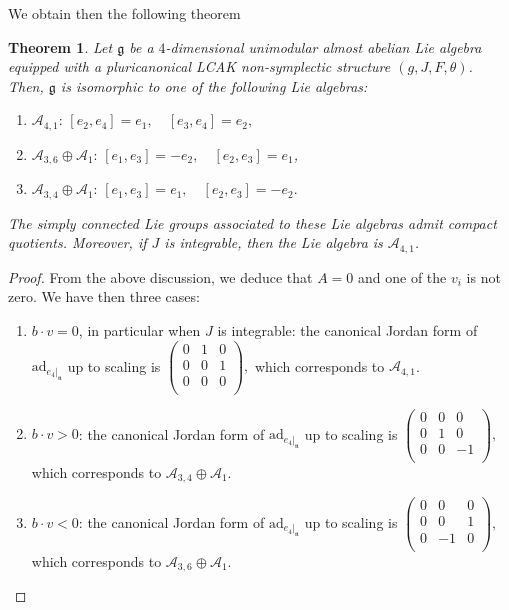 \documentclass[a4paper,11pt]{amsart}
\newtheorem{thm}{Theorem}
\theoremstyle{definition}
\renewcommand{\[}{\begin{equation*}}
\renewcommand{\]}{\end{equation*}}
\def \n {\mathfrak n}
\def \ad {\mbox{ad}}
\begin{document}
    We obtain then the following theorem
    \begin{thm}
    Let $\mathfrak{g}$ be a $4$-dimensional unimodular almost abelian Lie algebra equipped with a pluricanonical LCAK non-symplectic structure $(g, J, F, \theta)$. Then, $\mathfrak{g}$ is isomorphic to one of the following Lie algebras:
    \begin{enumerate}[label=\arabic*)]
    \item $\mathcal{A}_{4,1}:\, [e_2,e_4]=e_1,\quad [e_3,e_4]=e_2,$\\
    \item $\mathcal{A}_{3,6}\oplus \mathcal{A}_1:\,[e_1,e_3]=-e_2,\quad [e_2,e_3]=e_1$,\\
     \item $\mathcal{A}_{3,4}\oplus \mathcal{A}_1:\,[e_1,e_3]=e_1,\quad [e_2,e_3]=-e_2.$
\end{enumerate}
The simply connected Lie groups associated to these Lie algebras admit compact quotients. Moreover, if $J$ is integrable, then the Lie algebra is $\mathcal{A}_{4,1}$.
    \end{thm}
    \begin{proof}
From the above discussion, we deduce that $A=0$ and one of the $v_i$ is not zero. We have then three cases:

\begin{enumerate}
\item $b\cdot v= 0$, in particular when $J$ is integrable: the canonical Jordan form of  $\ad_{e_{4}|_\n}$ up to scaling is
$\begin{pmatrix} 
        0 & 1 &0\\
        0 & 0&1\\
        0 & 0&0\\
        \end{pmatrix},$ which corresponds to $\mathcal{A}_{4,1}$.

\item $b\cdot v>0$: the canonical Jordan form of  $\ad_{e_{4}|_\n}$ up to scaling is
$\begin{pmatrix} 
        0 & 0 &0\\
        0 & 1&0\\
        0 & 0&-1\\
        \end{pmatrix},$ which corresponds to $\mathcal{A}_{3,4}\oplus \mathcal{A}_1.$
 
\item $b\cdot v<0$: the canonical Jordan form of  $\ad_{e_{4}|_\n}$ up to scaling is
$\begin{pmatrix} 
        0 & 0 &0\\
        0 & 0&1\\
        0 & -1&0\\
        \end{pmatrix},$ which corresponds to $\mathcal{A}_{3,6}\oplus \mathcal{A}_1$.
\end{enumerate}
    \end{proof}
\end{document}
